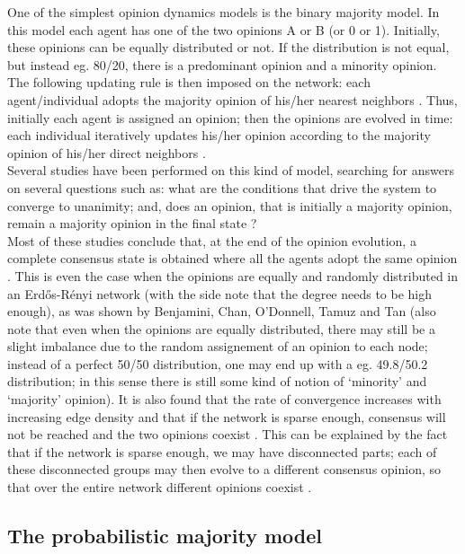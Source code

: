 \documentclass[11 pt , letterpaper , twoside , openright]{book}
\begin{document}
One of the simplest opinion dynamics models is the binary majority model. In this model each agent has one of the two opinions A or B (or 0 or 1). Initially, these opinions can be equally distributed or not. If the distribution is not equal, but instead eg. 80/20, there is a predominant opinion and a minority opinion.\\
The following updating rule is then imposed on the network: each agent/individual adopts the majority opinion of his/her nearest neighbors \cite{Nguyen2020}. Thus, initially each agent is assigned an opinion; then the opinions are evolved in time: each individual iteratively updates his/her opinion according to the majority opinion of his/her direct neighbors \cite{Nguyen2020}.\\
\newline
Several studies have been performed on this kind of model, searching for answers on several questions such as: what are the conditions that drive the system to converge to unanimity; and, does an opinion, that is initially a majority opinion, remain a majority opinion in the final state \cite{Nguyen2020}? \\
Most of these studies conclude that, at the end of the opinion evolution, a complete consensus state is obtained where all the agents adopt the same opinion \cite{Nguyen2020}. This is even the case when the opinions are equally and randomly distributed in an Erd\H{o}s-R\'{e}nyi network (with the side note that the degree needs to be high enough), as was shown by Benjamini, Chan, O'Donnell, Tamuz and Tan \cite{Benjamini2016} (also note that even when the opinions are equally distributed, there may still be a slight imbalance due to the random assignement of an opinion to each node; instead of a perfect 50/50 distribution, one may end up with a eg. 49.8/50.2 distribution; in this sense there is still some kind of notion of `minority' and `majority' opinion). It is also found that the rate of convergence increases with increasing edge density and that if the network is sparse enough, consensus will not be reached and the two opinions coexist \cite{Nguyen2020}. This can be explained by the fact that if the network is sparse enough, we may have disconnected parts; each of these disconnected groups may then evolve to a different consensus opinion, so that over the entire network different opinions coexist \cite{Nguyen2020}.

\subsection{The probabilistic majority model}
\end{document}
